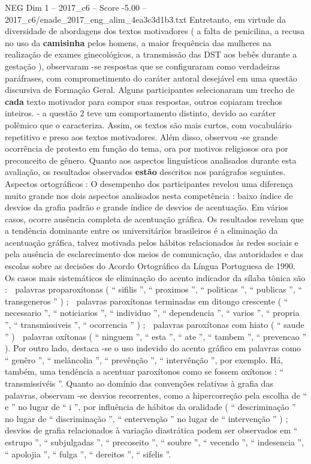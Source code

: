 \begin{textsample}{NEG Dim 1 – 2017\_c6 – Score -5.00 – 2017\_c6/enade\_2017\_eng\_alim\_4ea3c3d1b3.txt}
Entretanto, em virtude da diversidade de abordagens dos textos motivadores ( a falta de penicilina, a recusa no uso da \textbf{camisinha} pelos homens, a maior frequência das mulheres na realização de exames ginecológicos, a transmissão das DST aos bebês durante a gestação ), observaram -se respostas que se configuraram como verdadeiras paráfrases, com comprometimento do caráter autoral desejável em uma questão discursiva de Formação Geral.
Alguns participantes selecionaram um trecho de \textbf{cada} texto motivador para compor suas respostas, outros copiaram trechos inteiros. - a questão 2 teve um comportamento distinto, devido ao caráter polêmico que o caracteriza.
Assim, os textos são mais curtos, com vocabulário repetitivo e preso aos textos motivadores.
Além disso, observou -se grande ocorrência de protesto em função do tema, ora por motivos religiosos ora por preconceito de gênero.
Quanto aos aspectos linguísticos analisados durante esta avaliação, os resultados observados \textbf{estão} descritos nos parágrafos seguintes.
Aspectos ortográficos : O desempenho dos participantes revelou uma diferença muito grande nos dois aspectos analisados nesta competência : baixo índice de desvios da grafia padrão e grande índice de desvios de acentuação.
Em vários casos, ocorre ausência completa de acentuação gráfica.
Os resultados revelam que a tendência dominante entre os universitários brasileiros é a eliminação da acentuação gráfica, talvez motivada pelos hábitos relacionados às redes sociais e pela ausência de esclarecimento dos meios de comunicação, das autoridades e das escolas sobre as decisões do Acordo Ortográfico da Língua Portuguesa de 1990.
Os casos mais sistemáticos de eliminação do acento indicador da sílaba tônica são :  palavras proparoxítonas ( “ sifilis ”, “ proximos ”, “ politicas ”, “ publicas ”, “ transgeneros ” ) ;  palavras paroxítonas terminadas em ditongo crescente ( “ necessario ”, “ noticiarios ”, “ individuo ”, “ dependencia ”, “ varios ”, “ propria ”, “ transmissiveis ”, “ ocorrencia ” ) ;  palavras paroxítonas com hiato ( “ saude ” )  palavras oxítonas ( “ ninguem ”, “ esta ”, “ ate ”, “ tambem ”, “ prevencao ” ).
Por outro lado, destaca -se o uso indevido do acento gráfico em palavras como “ genêro ”, “ melâncolia ”, “ prevênção ”, “ intervênção ”, por exemplo.
Há, também, uma tendência a acentuar paroxítonos como se fossem oxítonos : “ transmissivéis ”.
Quanto ao domínio das convenções relativas à grafia das palavras, observam -se desvios recorrentes, como a hipercorreção pela escolha de “ e ” no lugar de “ i ”, por influência de hábitos da oralidade ( “ descriminação ” no lugar de “ discriminação ”, “ entervenção ” no lugar de “ intervenção ” ) ; desvios de grafia relacionados à variação diastrática podem ser observados em “ estrupo ”, “ subjulgadas ”, “ precoseito ”, “ soubre ”, “ vecendo ”, “ indesencia ”, “ apolojia ”, “ fulga ”, “ dereitos ”, “ sifelis ”.

\end{textsample}
